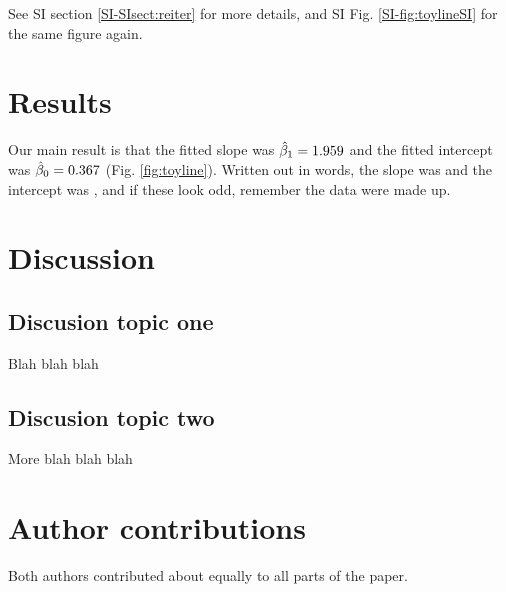 \documentclass[letterpaper,11pt]{article}
\begin{document}
See SI section \ref{SI-SIsect:reiter} for more details, and SI Fig. \ref{SI-fig:toylineSI} for 
the same figure again.

\section{Results}\label{section:results}

Our main result is that the fitted slope was $\hat{\beta}_1=1.959$ and the fitted intercept 
was $\hat{\beta}_0=0.367$ (Fig. \ref{fig:toyline}). Written out in words, the slope was 
\outputone{} and the intercept was \outputtwo{}, and if these look odd, remember the data were
made up. 

\section{Discussion}\label{section:discussion}

\subsection{Discusion topic one}

Blah blah blah

\subsection{Discusion topic two}

More blah blah blah

\section{Author contributions}

Both authors contributed about equally to all parts of the paper.
\end{document}
